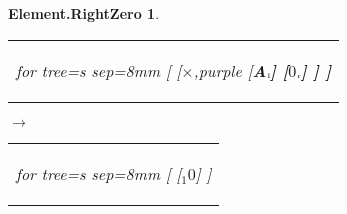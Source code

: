 \documentclass[UTF8,10pt]{ctexart}
\newcommand{\Bigskip}{\bigskip\medskip}
\newcommand{\subtreeA}{\bf A}
\newcommand{\I}{$_{\scriptscriptstyle 1}$}
\newcommand{\lc}{$_{\:\!\scriptscriptstyle\rm l\!}$}
\newcommand{\rc}{$_{\:\!\scriptscriptstyle\rm r\!}$}
\newcommand{\Zero}{$0$}
\newcommand{\Multiplication}{$\times$}
\newtheorem*{Element.RightZero}{\bf Element.RightZero }
\begin{document}
	\newpage

	\begin{center}\vspace*{\fill}
		\begin{Element.RightZero}
			\qquad\par\Bigskip
			\begin{tabular}{c}
				\begin{forest}
					for tree={s sep=8mm}
					[
						[\Multiplication,purple
							[\subtreeA\lc]
							[\Zero\rc]
						]
					]
				\end{forest}
			\end{tabular}
			\qquad
			$\longrightarrow$
			\qquad
			\begin{tabular}{c}
				\begin{forest}
					for tree={s sep=8mm}
					[
						[\I\Zero]
					]
				\end{forest}
			\end{tabular}
		\end{Element.RightZero}
	\vspace*{\fill}\end{center}

	\newpage
\end{document}

